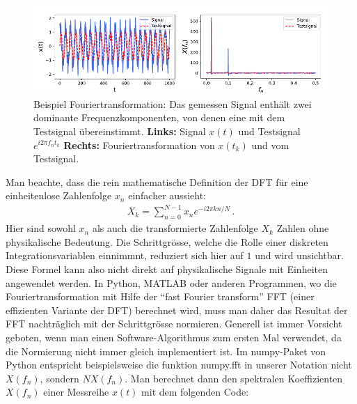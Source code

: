 \begin{figure}[htbp]
    \centering
        \includegraphics[width=\textwidth]{Figures/psd_fig1.pdf}
        \caption{Beispiel Fouriertransformation: Das gemessen Signal enthält zwei dominante Frequenzkomponenten, von denen eine mit dem Testsignal übereinstimmt. \textbf{Links:} Signal $x(t)$ und Testsignal $e^{i2\pi f_n t_k}$ \textbf{Rechts:} Fouriertransformation von $x(t_k)$ und vom Testsignal.}
        \label{fig:fouriertransformation}
\end{figure}
Man beachte, dass die rein mathematische Definition der DFT für eine einheitenlose Zahlenfolge $x_n$ einfacher aussieht:
\begin{align}
X_k = \sum_{n=0}^{N-1} x_n e^{-i 2 \pi k n/N}\,.
\label{eq:vl7-1c}
\end{align}
Hier sind sowohl $x_n$ als auch die transformierte Zahlenfolge $X_k$ Zahlen ohne physikalische Bedeutung. Die Schrittgrösse, welche die Rolle einer diskreten Integrationsvariablen einnimmnt, reduziert sich hier auf $1$ und wird unsichtbar. Diese Formel kann also nicht direkt auf physikalische Signale mit Einheiten angewendet werden. In Python, MATLAB oder anderen Programmen, wo die Fouriertransformation mit Hilfe der ``fast Fourier transform'' FFT (einer effizienten Variante der DFT) berechnet wird, muss man daher das Resultat der FFT nachträglich mit der Schrittgrösse normieren. Generell ist immer Vorsicht geboten, wenn man einen Software-Algorithmus zum ersten Mal verwendet, da die Normierung nicht immer gleich implementiert ist. Im numpy-Paket von Python entspricht beispielsweise die funktion numpy.fft in unserer Notation nicht $X(f_n)$, sondern $NX(f_n)$. Man berechnet dann den spektralen Koeffizienten $X(f_n)$ einer Messreihe $x(t)$ mit dem folgenden Code: 

